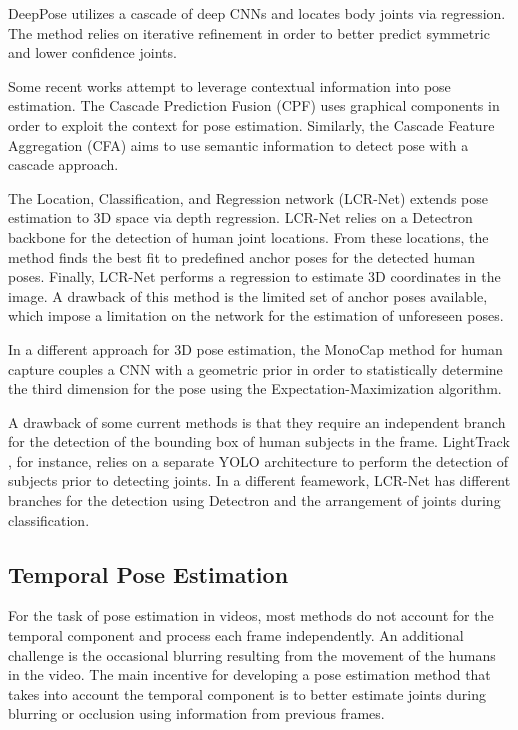 \documentclass[10pt,twocolumn,letterpaper]{article}
\begin{document}
DeepPose \cite{DeepPose} utilizes a cascade of deep CNNs and locates body joints via regression. The method relies on iterative refinement in order to better predict symmetric and lower confidence joints.


Some recent works attempt to leverage contextual information into pose estimation. The Cascade Prediction Fusion (CPF) \cite{zhang2019human} uses graphical components in order to exploit the context for pose estimation. Similarly, the Cascade Feature Aggregation (CFA) \cite{su2019improvement} aims to use semantic information to detect pose with a cascade approach.

The Location, Classification, and Regression network (LCR-Net) \cite{LCR-Net} extends pose estimation to 3D space via depth regression. 
LCR-Net relies on a Detectron backbone \cite{Detectron} for the detection of human joint locations. 
From these locations, the method finds the best fit to predefined anchor poses for the detected human poses. Finally, LCR-Net performs a regression to estimate 3D coordinates in the image. A drawback of this method is the limited set of anchor poses available, which impose a limitation on the network for the estimation of unforeseen poses.

In a different approach for 3D pose estimation, the MonoCap method for human capture \cite{Monocap} couples a CNN with a geometric prior in order to statistically determine the third dimension for the pose using the Expectation-Maximization algorithm.

A drawback of some current methods is that they require an independent branch for the detection of the bounding box of human subjects in the frame. LightTrack \cite{LightTrack}, for instance, relies on a separate YOLO \cite{YOLOv3} architecture to perform the detection of subjects prior to detecting joints. In a different feamework, LCR-Net \cite{LCR-Net} has different branches for the detection using Detectron \cite{Detectron} and the arrangement of joints during classification.

\subsection{Temporal Pose Estimation}
For the task of pose estimation in videos, most methods 
do not account for the temporal component and process each frame independently.
An additional challenge is
the occasional blurring resulting from the movement of the humans in the video. 
The main incentive for developing a pose estimation method that takes into account the temporal component is 
to better estimate joints during blurring or occlusion
using information from previous frames.
\end{document}

